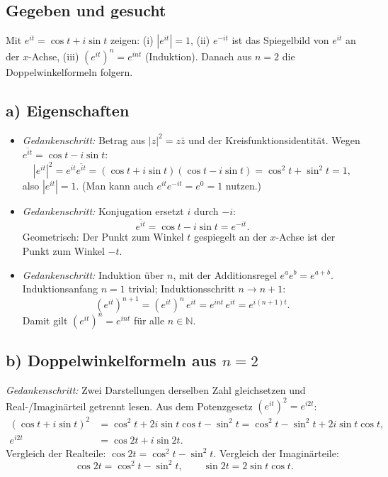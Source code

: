 
\subsection*{Gegeben und gesucht}
Mit $e^{it}=\cos t+i\sin t$ zeigen: (i) $|e^{it}|=1$, (ii) $e^{-it}$ ist
das Spiegelbild von $e^{it}$ an der $x$-Achse, (iii) $(e^{it})^n=e^{int}$
(Induktion). Danach aus $n=2$ die Doppelwinkelformeln folgern.

\subsection*{a) Eigenschaften}
\begin{itemize}
  \item[(i)] \emph{Gedankenschritt:} Betrag aus $|z|^2=z\bar z$ und der
        Kreisfunktionsidentität. Wegen $\overline{e^{it}}=\cos t-i\sin t$:
        \begin{equation*}
          |e^{it}|^2=e^{it}\overline{e^{it}}
          =(\cos t+i\sin t)(\cos t-i\sin t)
          =\cos^2t+\sin^2t=1,
        \end{equation*}
        also $|e^{it}|=1$. (Man kann auch $e^{it}e^{-it}=e^0=1$ nutzen.)
  \item[(ii)] \emph{Gedankenschritt:} Konjugation ersetzt $i$ durch $-i$:
        \begin{equation*}
          \overline{e^{it}}=\cos t-i\sin t=e^{-it} .
        \end{equation*}
        Geometrisch: Der Punkt zum Winkel $t$ gespiegelt an der $x$-Achse
        ist der Punkt zum Winkel $-t$.
  \item[(iii)] \emph{Gedankenschritt:} Induktion über $n$, mit der
        Additionsregel $e^{a}e^{b}=e^{a+b}$. Induktionsanfang $n=1$
        trivial; Induktionsschritt $n\to n+1$:
        \begin{equation*}
          (e^{it})^{n+1}=(e^{it})^n\,e^{it}=e^{int}\,e^{it}
          =e^{i(n+1)t}.
        \end{equation*}
        Damit gilt $(e^{it})^n=e^{int}$ für alle $n\in\mathbb N$.
\end{itemize}

\subsection*{b) Doppelwinkelformeln aus $n=2$}
\emph{Gedankenschritt:} Zwei Darstellungen derselben Zahl gleichsetzen und
Real-/Imaginärteil getrennt lesen. Aus dem Potenzgesetz $(e^{it})^2=e^{i2t}$:
\begin{align*}
  (\cos t+i\sin t)^2
  &=\cos^2t+2i\sin t\cos t-\sin^2t
  =\cos^2t-\sin^2t+2i\sin t\cos t,\\
  e^{i2t}&=\cos 2t+i\sin 2t .
\end{align*}
Vergleich der Realteile: $\cos 2t=\cos^2t-\sin^2t$. Vergleich der
Imaginärteile:
\begin{equation*}
  \boxed{\cos 2t=\cos^2t-\sin^2t},\qquad
  \boxed{\sin 2t=2\sin t\cos t}.
\end{equation*}

